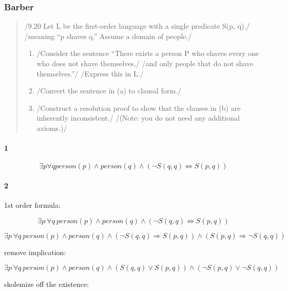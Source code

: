 \subsubsection{Barber}
\begin{quote}
   /9.20 Let L be the first-order language with a single predicate S(p, q),/
   /meaning “p shaves q.” Assume a domain of people./

   \begin{enumerate}
   \item /Consider the sentence “There exists a person P who shaves every one who does not shave themselves,/
     /and only people that do not shave themselves.”/
     /Express this in L./
   \item /Convert the sentence in (a) to clausal form./
   \item /Construct a resolution proof to show that the clauses in (b) are inherently inconsistent./
     /(Note: you do not need any additional axioms.)/
   \end{enumerate}
\end{quote}

\paragraph{1}
$$\exists p \forall q person(p) \wedge person(q) \wedge (\neg S(q,q) \Leftrightarrow S(p,q))$$

\paragraph{2}
1st order formula:

\begin{equation}
  \exists p \: \forall q \: person(p) \wedge person(q) \wedge (\neg S(q,q) \Leftrightarrow S(p,q))
\end{equation}

\begin{equation}
  \exists p \: \forall q \: person(p) \wedge person(q) \wedge (\neg S(q,q) \Rightarrow S(p,q)) \wedge (S(p,q) \Rightarrow \neg S(q,q))
\end{equation}

remove implication:

\begin{equation}
  \exists p \: \forall q \: person(p) \wedge person(q) \wedge (S(q,q) \vee S(p,q)) \wedge (\neg S(p,q) \vee \neg S(q,q))
\end{equation}

skolemize off the existence:

